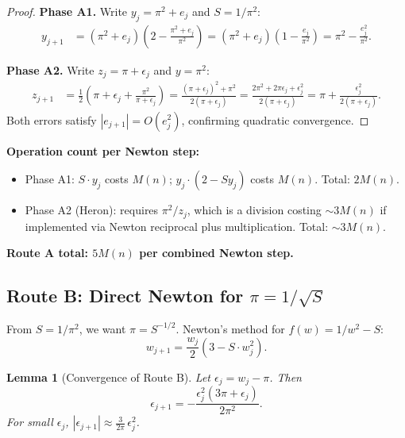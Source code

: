 \documentclass[11pt]{article}
\newtheorem{lemma}[theorem]{Lemma}
\begin{document}
\begin{proof}
\textbf{Phase A1.} Write $y_j = \pi^2 + e_j$ and $S = 1/\pi^2$:
\begin{align*}
y_{j+1} &= (\pi^2 + e_j)\!\left(2 - \frac{\pi^2 + e_j}{\pi^2}\right) = (\pi^2 + e_j)\!\left(1 - \frac{e_j}{\pi^2}\right) = \pi^2 - \frac{e_j^2}{\pi^2}.
\end{align*}

\textbf{Phase A2.} Write $z_j = \pi + \epsilon_j$ and $y = \pi^2$:
\begin{align*}
z_{j+1} &= \frac{1}{2}\!\left(\pi + \epsilon_j + \frac{\pi^2}{\pi + \epsilon_j}\right) = \frac{(\pi + \epsilon_j)^2 + \pi^2}{2(\pi + \epsilon_j)} = \frac{2\pi^2 + 2\pi\epsilon_j + \epsilon_j^2}{2(\pi + \epsilon_j)} = \pi + \frac{\epsilon_j^2}{2(\pi + \epsilon_j)}.
\end{align*}
Both errors satisfy $|e_{j+1}| = O(e_j^2)$, confirming quadratic convergence. \qedhere
\end{proof}

\noindent\textbf{Operation count per Newton step:}
\begin{itemize}
\item Phase A1: $S \cdot y_j$ costs $M(n)$; $y_j \cdot (2 - Sy_j)$ costs $M(n)$. Total: $2M(n)$.
\item Phase A2 (Heron): requires $\pi^2/z_j$, which is a division costing $\sim 3M(n)$ if implemented via Newton reciprocal plus multiplication. Total: $\sim 3M(n)$.
\end{itemize}
\textbf{Route A total: $5M(n)$ per combined Newton step.}

\subsection{Route B: Direct Newton for $\pi = 1/\sqrt{S}$}

From $S = 1/\pi^2$, we want $\pi = S^{-1/2}$. Newton's method for $f(w) = 1/w^2 - S$:
\begin{equation}\label{eq:routeB}
w_{j+1} = \frac{w_j}{2}(3 - S \cdot w_j^2).
\end{equation}

\begin{lemma}[Convergence of Route B]\label{lem:routeB}
Let $\epsilon_j = w_j - \pi$. Then
\begin{equation}\label{eq:routeB-error}
\epsilon_{j+1} = -\frac{\epsilon_j^2(3\pi + \epsilon_j)}{2\pi^2}.
\end{equation}
For small $\epsilon_j$, $|\epsilon_{j+1}| \approx \frac{3}{2\pi}\,\epsilon_j^2$.
\end{lemma}
\end{document}
